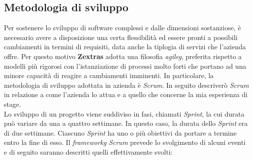 \subsection{Metodologia di sviluppo}\label{sec:met_svilpuppo}
    Per sostenere lo sviluppo di software complessi e dalle dimensioni sostanziose, è necessario avere a disposizione una certa flessibilità ed essere pronti a possibili cambiamenti in termini di requisiti, data anche la tiplogia di servizi che l'azienda offre. Per questo motivo \textbf{Zextras} adotta una filosofia \textit{\gls{agileg}}, preferita rispetto a modelli più rigorosi con l'istanziazione di processi molto forti che portano ad una minore capacità di reagire a cambiamenti imminenti. In particolare, la metodologia di sviluppo adottata in azienda è \textit{Scrum}. In seguito descriverò \textit{Scrum} in relazione a come l'azienda lo attua e a quello che concerne la mia esperienza di stage. \\
    Lo sviluppo di un progetto viene suddiviso in fasi, chiamati \textit{Sprint}, la cui durata può variare da una a quattro settimane. In questo caso, la durata dello \textit{Sprint} era di due settimane.
    Ciascuno \textit{Sprint} ha uno o più obiettivi da portare a termine entro la fine di esso.
    Il \textit{\gls{frameworkg}} \textit{Scrum} prevede lo svolgimento di alcuni eventi e di seguito saranno descritti quelli effettivamente svolti:
    
